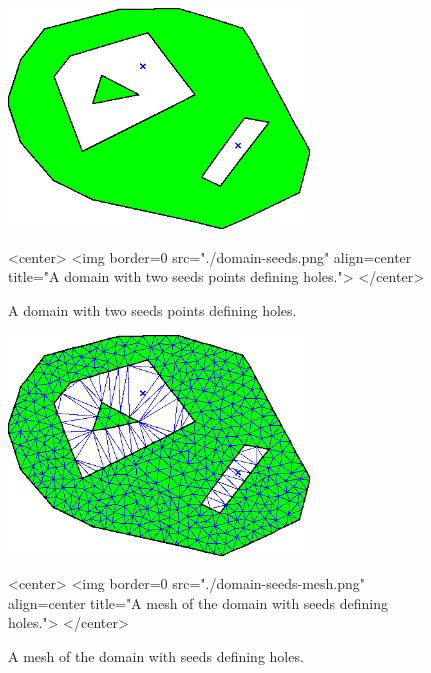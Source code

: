 \begin{figure}[htbp]
\begin{ccTexOnly}
\begin{center}
\includegraphics[width=8cm]{Mesh_2/domain-seeds}
\end{center}
\end{ccTexOnly}
\caption{A domain with two seeds points defining holes.}
\label{Domain-seeds}

\begin{ccHtmlOnly}
<center>
<img border=0 src="./domain-seeds.png"
     align=center title="A domain with two seeds points defining holes.">
</center>
\end{ccHtmlOnly}
\end{figure}

\begin{figure}[htbp]
\begin{ccTexOnly}
\begin{center}
\includegraphics[width=8cm]{Mesh_2/domain-seeds-mesh}
\end{center}
\end{ccTexOnly}
\caption{A mesh of the domain with seeds defining holes.}
\label{Domain-seeds-mesh}

\begin{ccHtmlOnly}
<center>
<img border=0 src="./domain-seeds-mesh.png"
     align=center title="A mesh of the domain with seeds defining holes.">
</center>
\end{ccHtmlOnly}
\end{figure}

